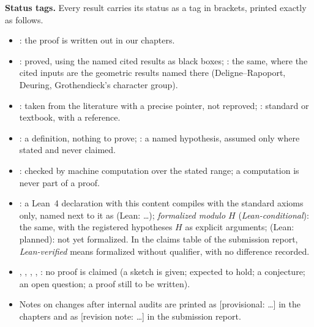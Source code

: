 \begin{sloppypar}
\noindent\textbf{Status tags.} Every result carries its status as a tag in brackets, printed exactly as follows.
\begin{itemize}\setlength{\itemsep}{0pt}
\item \stproved: the proof is written out in our chapters.
\item \stpmc: proved, using the named cited results as black boxes; : the same, where
  the cited inputs are the geometric results named there (Deligne--Rapoport, Deuring, Grothendieck's character group).
\item \stcited: taken from the literature with a precise pointer, not reproved; \stknown: standard or textbook, with a
  reference.
\item {}: a definition, nothing to prove; \sthyp: a named hypothesis, assumed only where stated and never
  claimed.
\item \stcomp: checked by machine computation over the stated range; a computation is never part of a proof.
\item \stformal: a Lean~4 declaration with this content compiles with the standard axioms only, named next to it as
  \textup{\small(Lean: \dots)}; \emph{formalized modulo $H$} (\emph{Lean-conditional}): the same, with the registered
  hypotheses $H$ as explicit arguments; \textup{\small(Lean: planned)}: not yet formalized. In the claims table of the
  submission report, \emph{Lean-verified} means formalized without qualifier, with no difference recorded.
\item \stsketch, \stexp, \stconj, \stopen, \sttoprove: no proof is claimed (a sketch is given; expected to hold; a
  conjecture; an open question; a proof still to be written).
\item Notes on changes after internal audits are printed as \textup{\textsf{\small[provisional: \dots]}} in the chapters and
  as \textup{\textsf{\small[revision note: \dots]}} in the submission report.
\end{itemize}
\end{sloppypar}
